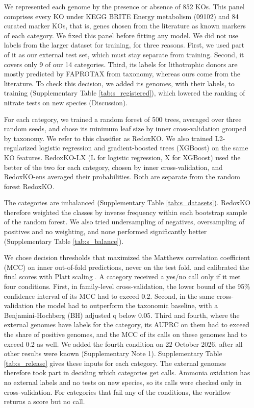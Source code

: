 \documentclass[10pt,a4paper,onecolumn]{article}
\begin{document}
We represented each genome by the presence or absence of 852 KOs. This
panel comprises every KO under KEGG BRITE Energy metabolism (09102) and
84 curated marker KOs, that is, genes chosen from the literature as
known markers of each category. We fixed this panel before fitting any
model. We did not use labels from the larger dataset for training, for
three reasons. First, we used part of it as our external test set, which
must stay separate from training. Second, it covers only 9 of our 14
categories. Third, its labels for lithotrophic donors are mostly
predicted by FAPROTAX \autocite{Louca2016} from taxonomy, whereas ours
come from the literature. To check this decision, we added its genomes,
with their labels, to training (Supplementary Table
\ref{tab:s_registered}), which lowered the ranking of nitrate tests on
new species (Discussion).

For each category, we trained a random forest \autocite{Breiman2001} of
500 trees, averaged over three random seeds, and chose its minimum leaf
size by inner cross-validation grouped by taxonomy. We refer to this
classifier as RedoxKO. We also trained L2-regularized logistic
regression and gradient-boosted trees (XGBoost) \autocite{Chen2016} on
the same KO features. RedoxKO-LX (L for logistic regression, X for
XGBoost) used the better of the two for each category, chosen by inner
cross-validation, and RedoxKO-ens averaged their probabilities. Both are
separate from the random forest RedoxKO.

The categories are imbalanced (Supplementary Table
\ref{tab:s_datasets}). RedoxKO therefore weighted the classes by inverse
frequency within each bootstrap sample of the random forest. We also
tried undersampling of negatives, oversampling of positives and no
weighting, and none performed significantly better (Supplementary Table
\ref{tab:s_balance}).

We chose decision thresholds that maximized the Matthews correlation
coefficient (MCC) \autocite{Matthews1975,Chicco2020} on inner
out-of-fold predictions, never on the test fold, and calibrated the
final scores with Platt scaling \autocite{Platt1999}. A category
received a yes/no call only if it met four conditions. First, in
family-level cross-validation, the lower bound of the 95\% confidence
interval of its MCC had to exceed 0.2. Second, in the same
cross-validation the model had to outperform the taxonomic baseline,
with a Benjamini-Hochberg (BH) adjusted q below 0.05. Third and fourth,
where the external genomes have labels for the category, its AUPRC on
them had to exceed the share of positive genomes, and the MCC of its
calls on these genomes had to exceed 0.2 as well. We added the fourth
condition on 22 October 2026, after all other results were known
(Supplementary Note 1). Supplementary Table \ref{tab:s_release} gives
these inputs for each category. The external genomes therefore took part
in deciding which categories get calls. Ammonia oxidation has no
external labels and no tests on new species, so its calls were checked
only in cross-validation. For categories that fail any of the
conditions, the workflow returns a score but no call.
\end{document}

